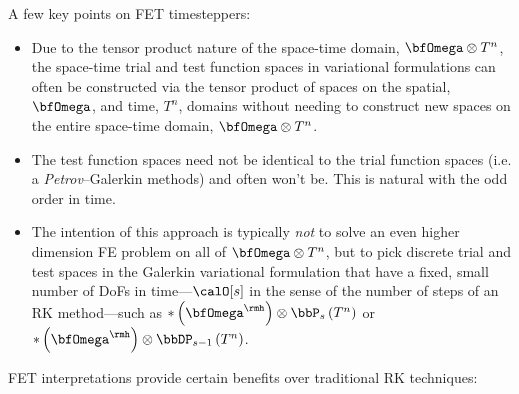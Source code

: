     A few key points on FET timesteppers:
    \begin{itemize}
        \item  Due to the tensor product nature of the space-time domain, $\bfOmega\otimes T^{n}$, the space-time trial and test function spaces in variational formulations can often be constructed via the tensor product of spaces on the spatial, $\bfOmega$, and time, $T^{n}$, domains without needing to construct new spaces on the entire space-time domain, $\bfOmega\otimes T^{n}$.
        \item  The test function spaces need not be identical to the trial function spaces (i.e. a \emph{Petrov}--Galerkin methods) and often won't be. This is natural with the odd order in time.
        \item  The intention of this approach is typically \emph{not} to solve an even higher dimension FE problem on all of $\bfOmega\otimes T^{n}$, but to pick discrete trial and test spaces in the Galerkin variational formulation that have a fixed, small number of DoFs in time---$\calO[s]$ in the sense of the number of steps of an RK method---such as $*\left(\bfOmega^{\rmh}\right)\otimes\bbP_{s}\left(T^{n}\right)$ or $*\left(\bfOmega^{\rmh}\right)\otimes\bbDP_{s - 1}\left(T^{n}\right)$.
    \end{itemize}
    FET interpretations provide certain benefits over traditional RK techniques:
